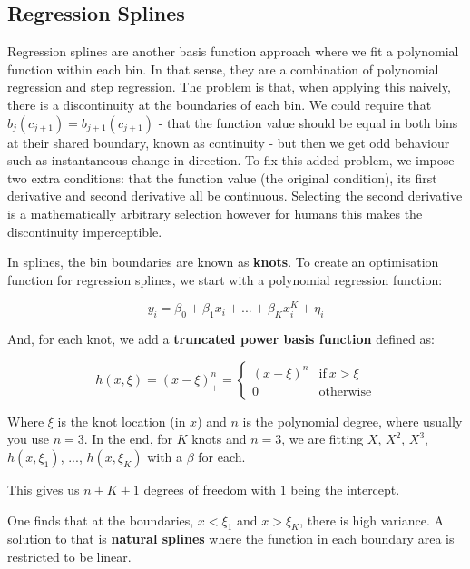 \subsection{Regression Splines}

Regression splines are another basis function approach where we fit a polynomial function within each bin. In that sense, they are a combination of polynomial regression and step regression. The problem is that, when applying this naively, there is a discontinuity at the boundaries of each bin. We could require that $b_{j}(c_{j+1})=b_{j+1}(c_{j+1})$ - that the function value should be equal in both bins at their shared boundary, known as continuity - but then we get odd behaviour such as instantaneous change in direction. To fix this added problem, we impose two extra conditions: that the function value (the original condition), its first derivative and second derivative all be continuous. Selecting the second derivative is a mathematically arbitrary selection however for humans this makes the discontinuity imperceptible.

In splines, the bin boundaries are known as \textbf{knots}. To create an optimisation function for regression splines, we start with a polynomial regression function:

$$ y_{i} = \beta_{0} + \beta_{1}x_{i} + ... + \beta_{K}x_{i}^{K} + \eta_{i} $$

And, for each knot, we add a \textbf{truncated power basis function} defined as:

\begin{equation}
    h(x,\xi) = (x-\xi)^{n}_{+} =
    \begin{cases}
        (x-\xi)^{n} & \text{if}\ x>\xi \\
        0 & \text{otherwise}
    \end{cases}
\end{equation}

Where $\xi$ is the knot location (in $x$) and $n$ is the polynomial degree, where usually you use $n=3$. In the end, for $K$ knots and $n=3$, we are fitting $X$, $X^{2}$, $X^{3}$, $h(x,\xi_{1})$, $...$, $h(x,\xi_{K})$ with a $\beta$ for each.

This gives us $n+K+1$ degrees of freedom with $1$ being the intercept.

One finds that at the boundaries, $x<\xi_{1}$ and $x>\xi_{K}$, there is high variance. A solution to that is \textbf{natural splines} where the function in each boundary area is restricted to be linear.

